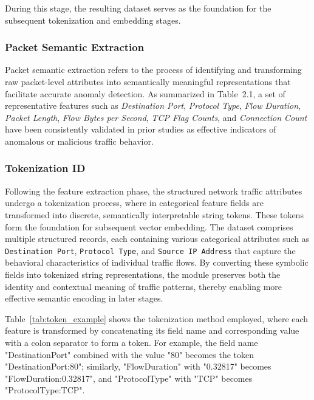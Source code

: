 \begin{ZhChapter}
    During this stage, the resulting dataset serves as the foundation for the subsequent tokenization and embedding stages.

    \subsubsection{Packet Semantic Extraction}

    Packet semantic extraction refers to the process of identifying and transforming raw packet-level attributes into semantically meaningful representations that facilitate accurate anomaly detection. As summarized in Table~2.1, a set of representative features such as \textit{Destination Port}, \textit{Protocol Type}, \textit{Flow Duration}, \textit{Packet Length}, \textit{Flow Bytes per Second}, \textit{TCP Flag Counts}, and \textit{Connection Count} have been consistently validated in prior studies as effective indicators of anomalous or malicious traffic behavior.





    \subsubsection{Tokenization ID}
    Following the feature extraction phase, the structured network traffic attributes undergo a tokenization process, where in categorical feature fields are transformed into discrete, semantically interpretable string tokens. These tokens form the foundation for subsequent vector embedding. The dataset comprises multiple structured records, each containing various categorical attributes such as \texttt{Destination Port}, \texttt{Protocol Type}, and \texttt{Source IP Address} that capture the behavioral characteristics of individual traffic flows. By converting these symbolic fields into tokenized string representations, the module preserves both the identity and contextual meaning of traffic patterns, thereby enabling more effective semantic encoding in later stages.



    Table~\ref{tab:token_example} shows the tokenization method employed, where each feature is transformed by concatenating its field name and corresponding value with a colon separator to form a token. For example, the field name "DestinationPort" combined with the value "80" becomes the token "DestinationPort:80"; similarly, "FlowDuration" with "0.32817" becomes "FlowDuration:0.32817", and "ProtocolType" with "TCP" becomes "ProtocolType:TCP".


\end{ZhChapter}

